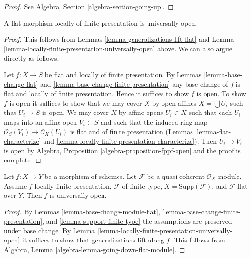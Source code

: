 \begin{proof}
See Algebra, Section \ref{algebra-section-going-up}.
\end{proof}

\begin{lemma}
\label{lemma-fppf-open}
A flat morphism locally of finite presentation is universally open.
\end{lemma}

\begin{proof}
This follows from Lemmas \ref{lemma-generalizations-lift-flat} and
Lemma \ref{lemma-locally-finite-presentation-universally-open} above.
We can also argue directly as follows.

\medskip\noindent
Let $f : X \to S$ be flat and locally of finite presentation.
By Lemmas \ref{lemma-base-change-flat} and
\ref{lemma-base-change-finite-presentation} any base change of $f$ is flat
and locally of finite presentation. Hence it suffices to show $f$ is open.
To show $f$ is open it suffices to show that we may cover
$X$ by open affines $X = \bigcup U_i$ such that $U_i \to S$
is open. We may cover $X$ by affine opens $U_i \subset X$ such that each
$U_i$ maps into an affine open $V_i \subset S$ and such that
the induced ring map $\mathcal{O}_S(V_i) \to \mathcal{O}_X(U_i)$ is
flat and of finite presentation (Lemmas \ref{lemma-flat-characterize} and
\ref{lemma-locally-finite-presentation-characterize}).
Then $U_i \to V_i$ is open by
Algebra, Proposition \ref{algebra-proposition-fppf-open}
and the proof is complete.
\end{proof}

\begin{lemma}
\label{lemma-pf-flat-module-open}
Let $f : X \to Y$ be a morphism of schemes.
Let $\mathcal{F}$ be a quasi-coherent $\mathcal{O}_X$-module.
Assume $f$ locally finite presentation, $\mathcal{F}$ of
finite type, $X = \text{Supp}(\mathcal{F})$, and
$\mathcal{F}$ flat over $Y$. Then $f$ is universally open.
\end{lemma}

\begin{proof}
By Lemmas \ref{lemma-base-change-module-flat},
\ref{lemma-base-change-finite-presentation}, and
\ref{lemma-support-finite-type}
the assumptions are preserved under base change.
By Lemma \ref{lemma-locally-finite-presentation-universally-open}
it suffices to show that generalizations lift along $f$.
This follows from Algebra, Lemma \ref{algebra-lemma-going-down-flat-module}.
\end{proof}

